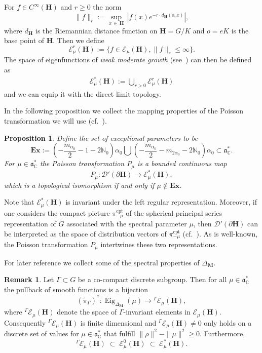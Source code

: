 \documentclass[10pt]{amsart}
\newtheorem{prop}[cdrthm]{Proposition}
\theoremstyle{definition}
\newtheorem{rema}[cdrthm]{Remark}
\DeclareMathOperator{\Eig}{Eig}
\DeclareMathOperator{\cpt}{cpt}
\newcommand{\mc}{\mathcal}
\newcommand{\cc}{\mathbb{C}}
\newcommand{\bfh}{\mathbf{H}}
\newcommand{\bfm}{\mathbf{M}}
\newcommand{\pl}{\partial}
\newcommand{\til}{\widetilde}
\newcommand{\N}{\mathbb{N}}
\renewcommand{\a}{\mathfrak a}
\begin{document}
For $f\in C^\infty({\bfh})$ and $r\geq 0$ the norm
\[
\|f\|_r:= \sup_{x\,\in\,{\bfh}}\,\left|f(x) e^{-r\cdot d_{{\bfh}}(o,x)}\right|,
\]
where $d_{{\bfh}}$ is the Riemannian distance function on ${\bfh}=G/K$ and $o=eK$ is the base point of ${\bfh}$. Then we define
\[
\mathcal E^r_\mu({\bfh}) :=\{f\in \mathcal E_\mu({\bfh}), \|f\|_r\leq\infty\}.
\]
The space of eigenfunctions of \emph{weak moderate growth} (see~\cite[Remark~12.5]{vBS87}) can then be defined as
\begin{align*}
\mathcal E^*_\mu({\bfh}) := \bigcup_{r>0}\mathcal E^r_\mu({\bfh})
\end{align*}
and we can equip it with the direct limit topology.

In the following proposition we collect the mapping properties of the Poisson transformation we will use (cf.~\cite{vBS87}).


\begin{prop}\label{thm:poisson_trafo}
Define the set of \emph{exceptional parameters} to be
\begin{equation}\label{eq:exceptional_points}
\mathbf{Ex} := \left(-\frac{m_{\alpha_0}}{2} - 1-2\N_0\right)\alpha_0
\bigcup\left(-\frac{m_{\alpha_0}}{2} - m_{2\alpha_0}-2\N_0\right)\alpha_0\subset \a^*_\cc.
\end{equation}
For $\mu\in \a^*_\cc$ the Poisson transformation $P_\mu$ is a bounded continuous map
\begin{equation}\label{eq:P_mu_isom_dist}
P_\mu:\mathcal D'(\pl{\bfh})\to \mathcal E^*_\mu({\bfh}),
\end{equation}
which is a topological isomorphism if and only if $\mu \notin \mathbf{Ex}$.
\end{prop}

Note that $\mathcal E^*_\mu({\bfh})$ is invariant under the left regular representation. Moreover, if one considers the compact picture $\pi_{-\mu}^{\cpt}$ of the spherical principal series representation of $G$ associated with the spectral parameter $\mu$, then $\mathcal D'(\pl{\bfh})$ can be interpreted as the space of distribution vectors of $\pi_{-\mu}^{\cpt}$ (cf.~\cite{vBS87}). As is well-known, the Poisson transformation $P_\mu$ intertwines these two representations.

For later reference we collect some of the spectral properties of $\Delta_{\bfm}$.

\begin{rema}\label{lem:lift_quantum}
Let $\Gamma\subset G$ be a co-compact discrete subgroup. Then for all $\mu\in \a^*_\cc$ the pullback of smooth functions is a bijection
\[
(\til\pi_{\Gamma})^*: \Eig_{\Delta_{\bfm}}(\mu)\to{^\Gamma \mathcal E_\mu({\bfh})},
\]
where ${^\Gamma \mathcal E_\mu({\bfh})}$ denote the space of $\Gamma$-invariant elements in $\mc{E}_\mu({\bfh})$. Consequently $^\Gamma \mathcal E_\mu({\bfh})$ is finite dimensional and $^\Gamma \mathcal E_\mu({\bfh})\neq 0$ only holds on a discrete set of values for $\mu\in \a^*_\cc$ that fulfill $\|\rho\|^2-\|\mu\|^2\geq 0$. Furthermore,
\[
^\Gamma \mathcal E_\mu({\bfh})\;\subset\;\mathcal E_\mu^0({\bfh})\;\subset\;\mathcal E^*_\mu({\bfh}).
\]
\end{rema}
\end{document}
